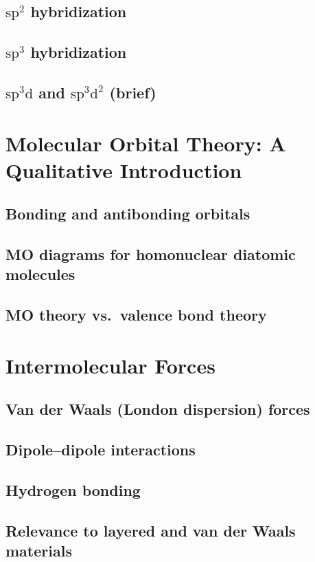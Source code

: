 \documentclass[11pt]{article}
\begin{document}
	\subsection{\texorpdfstring{$\mathrm{sp^2}$ hybridization}{sp2 hybridization}}
	\subsection{\texorpdfstring{$\mathrm{sp^3}$ hybridization}{sp3 hybridization}}
	\subsection{\texorpdfstring{$\mathrm{sp^3d}$ and $\mathrm{sp^3d^2}$ (brief)}{sp3d and sp3d2 (brief)}}

\section{Molecular Orbital Theory: A Qualitative Introduction}
	\subsection{Bonding and antibonding orbitals}
	\subsection{MO diagrams for homonuclear diatomic molecules}
	\subsection{MO theory vs.\ valence bond theory}

\section{Intermolecular Forces}
	\subsection{Van der Waals (London dispersion) forces}
	\subsection{Dipole--dipole interactions}
	\subsection{Hydrogen bonding}
	\subsection{Relevance to layered and van der Waals materials}
\end{document}
